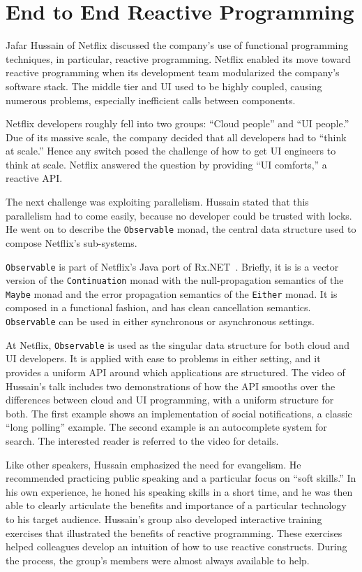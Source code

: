 \documentclass{jfp1}
\begin{document}
\section{End to End Reactive Programming}


Jafar Hussain of Netflix discussed the company's use of functional
programming techniques, in particular, reactive programming. Netflix
enabled its move toward reactive programming when its development team
modularized the company's software stack. The middle tier and UI used to
be highly coupled, causing numerous problems, especially inefficient calls
between components.

Netflix developers roughly fell into two groups: ``Cloud people'' and
``UI people.'' Due of its massive scale, the company decided that all
developers had to ``think at scale.'' Hence any switch posed the challenge
of how to get UI engineers to think at scale. Netflix answered the
question by providing ``UI comforts,'' a reactive API. 

The next challenge was exploiting parallelism.  Hussain stated that this
parallelism had to come easily, because no developer could be trusted with
locks. He went on to describe the \texttt{Observable} monad, the central
data structure used to compose Netflix's sub-systems. 

{\tt Observable} is part of Netflix's Java port of
Rx.NET~\cite{Christensen:2013:Reactive}. Briefly, it is is a vector
version of the {\tt Continuation} monad with the null-propagation
semantics of the {\tt Maybe} monad and the error propagation semantics of
the {\tt Either} monad. It is composed in a functional fashion, and has
clean cancellation semantics. \texttt{Observable} can be used in either
synchronous or asynchronous settings.

At Netflix, \texttt{Observable} is used as the singular data structure for
both cloud and UI developers. It is applied with ease to problems in
either setting, and it provides a uniform API around which applications
are structured. The video of Hussain's talk includes two demonstrations of
how the API smooths over the differences between cloud and UI programming,
with a uniform structure for both. The first example shows an
implementation of social notifications, a classic ``long polling''
example. The second example is an autocomplete system for search. The
interested reader is referred to the video for details. 

Like other speakers, Hussain emphasized the need for evangelism.  He
recommended practicing public speaking and a particular focus on ``soft
skills.'' In his own experience, he honed his speaking skills in a short
time, and he was then able to clearly articulate the benefits and
importance of a particular technology to his target audience.  Hussain's
group also developed interactive training exercises that illustrated the
benefits of reactive programming. These exercises helped colleagues
develop an intuition of how to use reactive constructs. During the
process, the group's members were almost always available to help.
\end{document}
